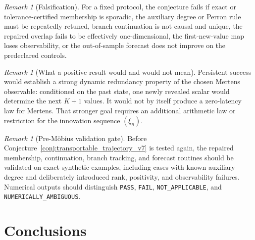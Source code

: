 \documentclass[11pt]{amsart}
\numberwithin{equation}{section}
\theoremstyle{plain}
\theoremstyle{definition}
\theoremstyle{remark}
\newtheorem{remark}[theorem]{Remark}
\begin{document}
\begin{remark}[Falsification]
\label{rem:falsification_v7}
For a fixed protocol, the conjecture fails if exact or tolerance-certified membership is sporadic, the auxiliary degree or Perron rule must be repeatedly retuned, branch continuation is not causal and unique, the repaired overlap fails to be effectively one-dimensional, the first-new-value map loses observability, or the out-of-sample forecast does not improve on the predeclared controls.
\end{remark}

\begin{remark}[What a positive result would and would not mean]
\label{rem:success_v7}
Persistent success would establish a strong dynamic redundancy property of the chosen Mertens observable: conditioned on the past state, one newly revealed scalar would determine the next $K+1$ values. It would not by itself produce a zero-latency law for Mertens. That stronger goal requires an additional arithmetic law or restriction for the innovation sequence $(\xi_n)$.
\end{remark}

\begin{remark}[Pre-M\"obius validation gate]
\label{rem:premobius_gate}
Before Conjecture~\ref{conj:transportable_trajectory_v7} is tested again, the repaired membership, continuation, branch tracking, and forecast routines should be validated on exact synthetic examples, including cases with known auxiliary degree and deliberately introduced rank, positivity, and observability failures. Numerical outputs should distinguish \texttt{PASS}, \texttt{FAIL}, \texttt{NOT\_APPLICABLE}, and \texttt{NUMERICALLY\_AMBIGUOUS}.
\end{remark}

\section{Conclusions}
\label{sec:conclusions}
\end{document}
